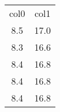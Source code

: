 \begin{table}
\begin{tabular}{cc}
col0 & col1 \\
8.5 & 17.0 \\
8.3 & 16.6 \\
8.4 & 16.8 \\
8.4 & 16.8 \\
8.4 & 16.8 \\
\end{tabular}
\end{table}
